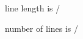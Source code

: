 \documentclass[trimmarks]{bookpackers}
\begin{document}
line length is \number\numexpr\textwidth/\zw\relax\par
number of lines is \the\numexpr\textheight/\Cvs\relax\par

\end{document}
